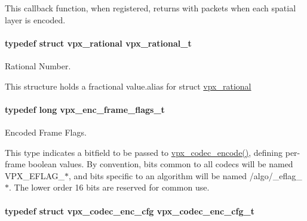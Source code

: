 This callback function, when registered, returns with packets when each spatial layer is encoded. 
\paragraph[{\texorpdfstring{vpx\+\_\+rational\+\_\+t}{vpx_rational_t}}]{\setlength{\rightskip}{0pt plus 5cm}typedef struct {\bf vpx\+\_\+rational}  {\bf vpx\+\_\+rational\+\_\+t}}\hypertarget{group__encoder_ga2c08c6d71202024f17a5aef71a3d13e5}{}\label{group__encoder_ga2c08c6d71202024f17a5aef71a3d13e5}


Rational Number. 

This structure holds a fractional value.\+alias for struct \hyperlink{structvpx__rational}{vpx\+\_\+rational} 
\paragraph[{\texorpdfstring{vpx\+\_\+enc\+\_\+frame\+\_\+flags\+\_\+t}{vpx_enc_frame_flags_t}}]{\setlength{\rightskip}{0pt plus 5cm}typedef long {\bf vpx\+\_\+enc\+\_\+frame\+\_\+flags\+\_\+t}}\hypertarget{group__encoder_ga99e4a3c966f0de19fe1aa626bd860366}{}\label{group__encoder_ga99e4a3c966f0de19fe1aa626bd860366}


Encoded Frame Flags. 

This type indicates a bitfield to be passed to \hyperlink{group__encoder_gaf990542e2aeb389f05fae3e9c7803639}{vpx\+\_\+codec\+\_\+encode()}, defining per-\/frame boolean values. By convention, bits common to all codecs will be named V\+P\+X\+\_\+\+E\+F\+L\+A\+G\+\_\+$\ast$, and bits specific to an algorithm will be named /algo/\+\_\+eflag\+\_\+$\ast$. The lower order 16 bits are reserved for common use. 
\paragraph[{\texorpdfstring{vpx\+\_\+codec\+\_\+enc\+\_\+cfg\+\_\+t}{vpx_codec_enc_cfg_t}}]{\setlength{\rightskip}{0pt plus 5cm}typedef struct {\bf vpx\+\_\+codec\+\_\+enc\+\_\+cfg}  {\bf vpx\+\_\+codec\+\_\+enc\+\_\+cfg\+\_\+t}}\hypertarget{group__encoder_ga946236c809e493b31a815d82db1e59db}{}\label{group__encoder_ga946236c809e493b31a815d82db1e59db}


